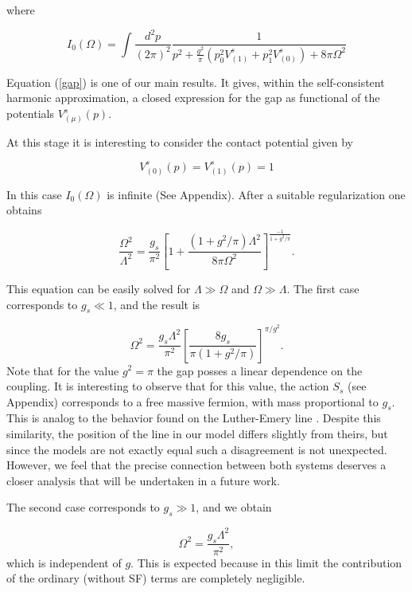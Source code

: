 \documentclass[a4paper,a4paper]{article}
\begin{document}
where

\begin{equation}
I_{0}(\Omega)=\int\frac{d^2p}{(2\pi)^2}\frac{1}{p^2+\frac{g^2}{\pi}\left(p_0^2
V^s_{(1)}+p_1^2 V^s_{(0)}\right) + 8\pi\Omega^2}
\end{equation}

Equation (\ref{gap}) is one of our main results. It gives, within the self-consistent
harmonic approximation, a closed expression for the gap as functional of the
potentials $V^s_{(\mu)}(p)$.

At this stage it is interesting to consider the contact potential given by

\begin{equation}
V^s_{(0)}(p)=V^s_{(1)}(p)=1
\end{equation}

 In this case $I_0(\Omega)$ is infinite (See Appendix). After a suitable regularization one
obtains

\begin{equation}
\frac{\Omega^2}{\Lambda^2}=\frac{g_s}{\pi^2}
\left[1+\frac{(1+g^2/\pi)\Lambda^2}{8\pi\Omega^2}\right]^{\frac{-1}{1+g^2/\pi}}.
\end{equation}

\noindent This equation can be easily solved for $\Lambda\gg\Omega$ and
$\Omega\gg\Lambda$. The first case corresponds to $g_s\ll 1$, and the result is

\begin{equation}
\Omega^2=\frac{g_s\Lambda^2}{\pi^2}
\left[\frac{8g_s}{\pi(1+g^2/\pi)}\right]^{\pi/g^2}.
\end{equation}
Note that for the value $g^2=\pi$ the gap posses a linear dependence on the coupling.
It is interesting to observe that for this value, the action $S_s$ (see Appendix)
corresponds to a free massive fermion, with mass proportional to $g_s$. This is analog
to the behavior found on the Luther-Emery line \cite{Luther-Emery}. Despite this
similarity, the position of the line in our model differs slightly from theirs, but
since the models are not exactly equal such a disagreement is not unexpected. However,
we feel that the precise connection between both systems deserves a closer analysis
that will be undertaken in a future work.

The second case corresponds to $g_s\gg 1$, and we obtain

\begin{equation}
\Omega^2=\frac{g_s\Lambda^2}{\pi^2},
\end{equation}
which is independent of $g$. This is expected because in this limit the contribution
of the ordinary (without SF) terms are completely negligible.
\end{document}
